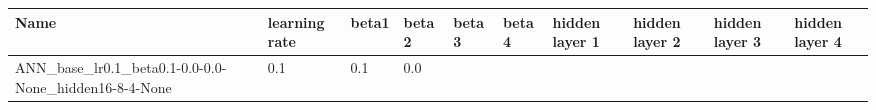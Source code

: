 \documentclass[11pt, a4paper , landscape]{article}
\begin{document}
\begin{longtable}[]{@{}llllllllll@{}}
\toprule
\begin{minipage}[b]{0.04\columnwidth}\raggedright\strut
Name\strut
\end{minipage} & \begin{minipage}[b]{0.09\columnwidth}\raggedright\strut
learning rate\strut
\end{minipage} & \begin{minipage}[b]{0.04\columnwidth}\raggedright\strut
beta1\strut
\end{minipage} & \begin{minipage}[b]{0.05\columnwidth}\raggedright\strut
beta 2\strut
\end{minipage} & \begin{minipage}[b]{0.05\columnwidth}\raggedright\strut
beta 3\strut
\end{minipage} & \begin{minipage}[b]{0.05\columnwidth}\raggedright\strut
beta 4\strut
\end{minipage} & \begin{minipage}[b]{0.10\columnwidth}\raggedright\strut
hidden layer 1\strut
\end{minipage} & \begin{minipage}[b]{0.10\columnwidth}\raggedright\strut
hidden layer 2\strut
\end{minipage} & \begin{minipage}[b]{0.09\columnwidth}\raggedright\strut
hidden layer 3\strut
\end{minipage} & \begin{minipage}[b]{0.11\columnwidth}\raggedright\strut
hidden layer 4\strut
\end{minipage}\tabularnewline
\midrule
\endhead
\begin{minipage}[t]{0.04\columnwidth}\raggedright\strut
ANN\_base\_lr0.1\_beta0.1-0.0-0.0-None\_hidden16-8-4-None\strut
\end{minipage} & \begin{minipage}[t]{0.09\columnwidth}\raggedright\strut
0.1\strut
\end{minipage} & \begin{minipage}[t]{0.04\columnwidth}\raggedright\strut
0.1\strut
\end{minipage} & \begin{minipage}[t]{0.05\columnwidth}\raggedright\strut
0.0\strut
\end{minipage} & \begin{minipage}[t]{0.05\columnwidth}\raggedright\strut

\end{minipage}
\end{longtable}
\end{document}
